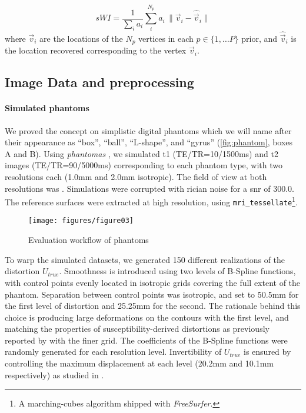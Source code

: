  \begin{equation}
  sWI = \frac{1}{\sum_i a_i} \sum\limits_i^{N_p} a_i\,\|
  \vec{v}_i - \hat{\vec{v}}_i \|
  \label{eq:swindex}
  \end{equation}
%
  where $\vec{v}_i$ are the locations of the $N_p$ vertices in each $p \in \{1, \dots P\}$
  prior, and $\hat{\vec{v}}_i$ is the location
  recovered corresponding to the vertex $\vec{v}_i$.

\subsection{Image Data and preprocessing}
\label{sec:datasets}

\paragraph*{Simulated phantoms}%
\label{sec:digital_phantoms}
We proved the concept on simplistic digital phantoms which we will name after their
  appearance as ``box'', ``ball'', ``L-shape'', and ``gyrus'' (\autoref{fig:phantom},
  boxes A and B).
Using \emph{phantomas} \citep{caruyer_phantomas_2014}, we simulated
  \gls*{t1} (TE/TR=10/1500ms) and \gls*{t2} images (TE/TR=90/5000ms)
  corresponding to each phantom type, with two resolutions each
  (1.0mm and 2.0mm isotropic).
The field of view at both resolutions was .
Simulations were corrupted with rician noise for a \gls*{snr} of 300.0.
The reference surfaces were extracted at high resolution, using 
  \texttt{mri\_tessellate}\footnote{A marching-cubes algorithm shipped with 
  \emph{FreeSurfer}.}.

\begin{figure*}
\texttt{[image: figures/figure03]}
\caption{Evaluation workflow of phantoms}\label{fig:evphantoms}
\end{figure*}

To warp the simulated datasets, we generated 150 different realizations of
  the distortion $U_{true}$.
Smoothness is introduced using two levels of B-Spline functions, with control points evenly
  located in isotropic grids covering the full extent of the phantom.
Separation between control points was isotropic, and set to 50.5mm for the first level
  of distortion and 25.25mm for the second.
The rationale behind this choice is producing large deformations on the contours with
  the first level, and matching the properties of susceptibility-derived distortions
  as previously reported by \cite{irfanoglu_susceptibility_2011} with the finer grid.
The coefficients of the B-Spline functions were randomly generated for each resolution level.
Invertibility of $U_{true}$ is ensured by controlling the maximum displacement at each
  level (20.2mm and 10.1mm respectively) as studied in \citep{rueckert_diffeomorphic_2006}.

